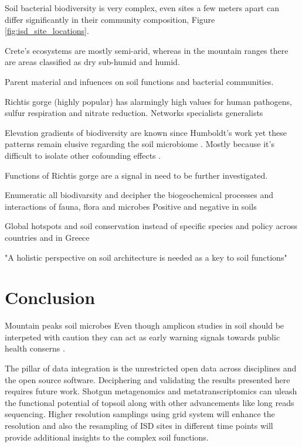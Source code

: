 Soil bacterial biodiversity is very complex, even sites a few meters apart can differ
significantly in their community composition, Figure \ref{fig:isd_site_locations}.

Crete's ecosystems are mostly semi-arid, whereas in the mountain ranges there 
are areas classified as dry sub-humid and humid. 

Parent material and infuences on soil functions and bacterial communities.

Richtis gorge (highly popular) has alarmingly high values for human pathogens, sulfur respiration and
nitrate reduction. 
Networks specialists generalists \parencite{Barberan2012}

Elevation gradients of biodiversity are known since Humboldt's work \parencite{Rahbek2019} 
yet these patterns remain elusive regarding the soil microbiome \parencite{Looby2020, Siles2023}.
Mostly because it's difficult to isolate other cofounding effects \parencite{Nottingham2018}. 

Functions of Richtis gorge are a signal in need to be further investigated.

Enumeratic all biodivarsity \parencite{Anthony2023} and decipher the biogeochemical 
processes and interactions of fauna, flora and microbes \parencite{Fry2019, Crowther2019,GRANDY201640,Delgado-Baquerizo2020}
Positive and negative in soils \parencite{Liu2024}

Global hotspots \parencite{Guerra2022}
and soil conservation instead of specific species \parencite{guerra2021tracking}
and policy \parencite{KONINGER2022} across countries \parencite{Putten2023} and in Greece \parencite{SCHISMENOS2022100035}

"A holistic perspective on soil architecture is needed as a key to soil functions" \parencite{philippot2024the-interplay}
\section{Conclusion}

Mountain peaks soil microbes \parencite{Adamczyk2019}
Even though amplicon studies in soil should be interpeted with caution \parencite{alteio2021} they 
can act as early warning signals towards public health conserns \parencite{banerjee2023Soil}.

The pillar of data integration is the unrestricted open data across disciplines and 
the open source software.
Deciphering and validating the results presented here requires future work.
Shotgun metagenomics and metatranscriptomics can uleash the functional potential of
topsoil along with other advancements like long reads sequencing. Higher resolution
samplings using grid system will enhance the resolution and also the resampling of
ISD sites in different time points will provide additional insights to the complex soil 
functions.

